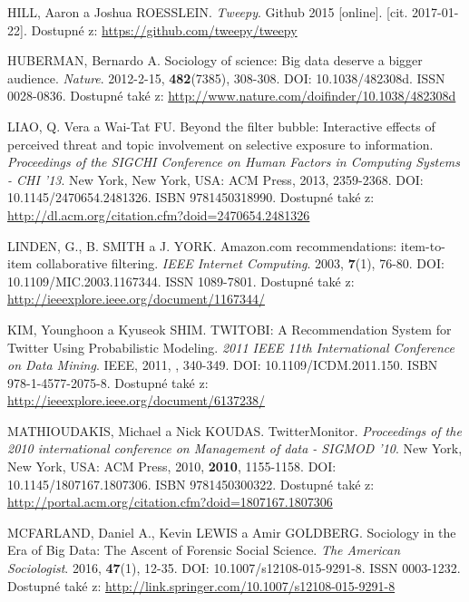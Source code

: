 \documentclass[12pt, a4paper]{article}
\numberwithin{equation}{section} 	%
\begin{document}
\begin{thebibliography}{99}
    HILL, Aaron a Joshua ROESSLEIN. \textit{Tweepy}. Github 2015 [online]. [cit. 2017-01-22]. Dostupné z: \url{https://github.com/tweepy/tweepy}

    HUBERMAN, Bernardo A. Sociology of science: Big data deserve a bigger audience. \textit{Nature}. 2012-2-15, \textbf{482}(7385), 308-308. DOI: 10.1038/482308d. ISSN 0028-0836. Dostupné také z: \url{http://www.nature.com/doifinder/10.1038/482308d}

    LIAO, Q. Vera a Wai-Tat FU. Beyond the filter bubble: Interactive effects of perceived threat and topic involvement on selective exposure to information. \textit{Proceedings of the SIGCHI Conference on Human Factors in Computing Systems - CHI '13}. New York, New York, USA: ACM Press, 2013, 2359-2368. DOI: 10.1145/2470654.2481326. ISBN 9781450318990. Dostupné také z: \url{http://dl.acm.org/citation.cfm?doid=2470654.2481326}

    LINDEN, G., B. SMITH a J. YORK. Amazon.com recommendations: item-to-item collaborative filtering. \textit{IEEE Internet Computing}. 2003, \textbf{7}(1), 76-80. DOI: 10.1109/MIC.2003.1167344. ISSN 1089-7801. Dostupné také z: \url{http://ieeexplore.ieee.org/document/1167344/}

    KIM, Younghoon a Kyuseok SHIM. TWITOBI: A Recommendation System for Twitter Using Probabilistic Modeling. \textit{2011 IEEE 11th International Conference on Data Mining}. IEEE, 2011, , 340-349. DOI: 10.1109/ICDM.2011.150. ISBN 978-1-4577-2075-8. Dostupné také z: \url{http://ieeexplore.ieee.org/document/6137238/}

    MATHIOUDAKIS, Michael a Nick KOUDAS. TwitterMonitor. \textit{Proceedings of the 2010 international conference on Management of data - SIGMOD '10}. New York, New York, USA: ACM Press, 2010, \textbf{2010}, 1155-1158. DOI: 10.1145/1807167.1807306. ISBN 9781450300322. Dostupné také z: \url{http://portal.acm.org/citation.cfm?doid=1807167.1807306}

    MCFARLAND, Daniel A., Kevin LEWIS a Amir GOLDBERG. Sociology in the Era of Big Data: The Ascent of Forensic Social Science. \textit{The American Sociologist}. 2016, \textbf{47}(1), 12-35. DOI: 10.1007/s12108-015-9291-8. ISSN 0003-1232. Dostupné také z: \url{http://link.springer.com/10.1007/s12108-015-9291-8}


\end{thebibliography}
\end{document}
